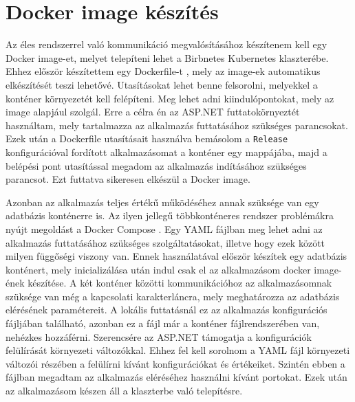 \chapter{Docker image készítés}
\label{chapt:birdnetes-kubernetes}
Az éles rendszerrel való kommunikáció megvalósításához készítenem kell egy Docker image-et, melyet telepíteni lehet a Birbnetes Kubernetes klaszterébe.
Ehhez először készítettem egy Dockerfile-t \cite{dockerfile}, mely az image-ek automatikus elkészítését teszi lehetővé.
Utasításokat lehet benne felsorolni, melyekkel a konténer környezetét kell felépíteni.
Meg lehet adni kiindulópontokat, mely az image alapjául szolgál.
Erre a célra én az ASP.NET futtatokörnyeztét használtam, mely tartalmazza az alkalmazás futtatásához szükséges parancsokat.
Ezek után a Dockerfile utasításait használva bemásolom a \verb+Release+ konfigurációval fordított alkalmazásomat a konténer egy mappájába, 
majd a belépési pont utasítással megadom az alkalmazás indításához szükséges parancsot.
Ezt futtatva sikeresen elkészül a Docker image.

Azonban az alkalmazás teljes értékű működéséhez annak szüksége van egy adatbázis konténerre is.
Az ilyen jellegű többkonténeres rendszer problémákra nyújt megoldást a Docker Compose \cite{docker-compose}.
Egy YAML fájlban meg lehet adni az alkalmazás futtatásához szükséges szolgáltatásokat, illetve hogy ezek között milyen függőségi viszony van.
Ennek használatával először készítek egy adatbázis konténert, mely inicializálása után indul csak el az alkalmazásom docker image-ének készítése.
A két konténer közötti kommunikációhoz az alkalmazásomnak szüksége van még a kapcsolati karakterláncra, mely meghatározza az adatbázis elérésének paramétereit.
A lokális futtatásnál ez az alkalmazás konfigurációs fájljában található, azonban ez a fájl már a konténer fájlrendszerében van, nehézkes hozzáférni.
Szerencsére az ASP.NET támogatja a konfigurációk felülírását környezeti változókkal.
Ehhez fel kell sorolnom a YAML fájl környezeti változói részében a felülírni kívánt konfigurációkat és értékeiket.
Szintén ebben a fájlban megadtam az alkalmazás eléréséhez használni kívánt portokat.
Ezek után az alkalmazásom készen áll a klaszterbe való telepítésre.